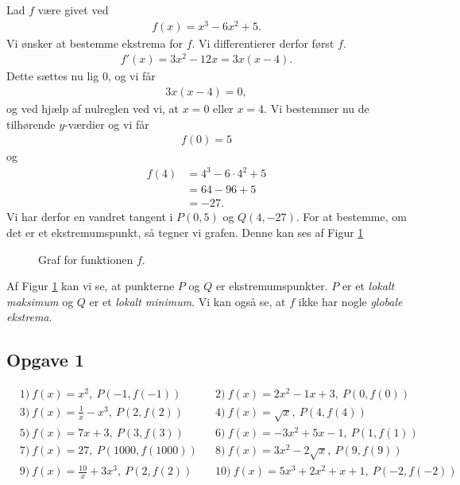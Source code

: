 \begin{exa}
	Lad $f$ være givet ved
	\begin{align*}
		f(x) = x^3-6x^2+5.
	\end{align*}
	Vi ønsker at bestemme ekstrema for $f$. Vi differentierer derfor først $f$.
	\begin{align*}
		f'(x) = 3x^2-12x = 3x(x-4).
	\end{align*}
	Dette sættes nu lig $0$, og vi får
	\begin{align*}
		3x(x-4) = 0, 
	\end{align*}
	og ved hjælp af nulreglen ved vi, at $x=0$ eller $x = 4$. Vi bestemmer nu de tilhørende $y$-værdier og vi får
	\begin{align*}
		f(0) = 5
	\end{align*}
	og 
	\begin{align*}
		f(4) &= 4^3 - 6\cdot 4^2+5\\
		&= 64-96+5\\
		&= -27.
	\end{align*}
	Vi har derfor en vandret tangent i $P(0,5)$ og $Q(4,-27)$. For at bestemme, om det er et ekstremumspunkt, så tegner vi grafen. Denne kan ses af Figur \ref{fig:ekstrema}
	\begin{figure}[H]
		\centering
		\caption{Graf for funktionen $f$.}
		\label{fig:ekstrema}
	\end{figure}
\end{exa}
Af Figur \ref{fig:ekstrema} kan vi se, at punkterne $P$ og $Q$ er ekstremumspunkter. $P$ er et \textit{lokalt maksimum} og $Q$ er et \textit{lokalt minimum}. Vi kan også se, at $f$ ikke har nogle 
\textit{globale ekstrema}.




\subsection*{Opgave 1}
\begin{align*}
&1) \ f(x) = x^2,\  P(-1,f(-1))  &&2) \   f(x)=2x^2-1x+3, \ P(0,f(0))    \\
&3) \ f(x) = \frac{1}{x} -x^3, \ P(2,f(2))   &&4) \ f(x) = \sqrt{x}, \ P(4,f(4))    \\
&5) \ f(x) = 7x+3,\ P(3,f(3))   &&6) \ f(x) = -3x^2+5x-1, \ P(1,f(1))     \\
&7) \ f(x) = 27, \ P(1000,f(1000))   &&8) \ f(x) = 3x^2-2\sqrt{x}, \ P(9,f(9))     \\
&9) \ f(x) = \frac{10}{x}+3x^3, \ P(2,f(2))   &&10) \ f(x) = 5x^3+2x^2+x+1, \ P(-2,f(-2))     \\
\end{align*}
	
